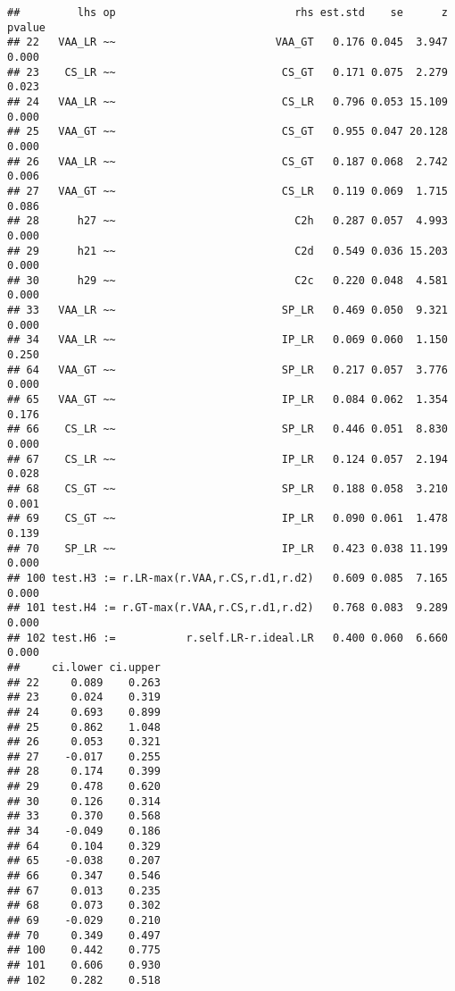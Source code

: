 \documentclass[
]{article}
\newenvironment{Shaded}{\begin{snugshade}}{\end{snugshade}}
\newcommand{\CommentTok}[1]{\textcolor[rgb]{0.56,0.35,0.01}{\textit{#1}}}
\newcommand{\DecValTok}[1]{\textcolor[rgb]{0.00,0.00,0.81}{#1}}
\newcommand{\KeywordTok}[1]{\textcolor[rgb]{0.13,0.29,0.53}{\textbf{#1}}}
\newcommand{\NormalTok}[1]{#1}
\newcommand{\OperatorTok}[1]{\textcolor[rgb]{0.81,0.36,0.00}{\textbf{#1}}}
\newcommand{\StringTok}[1]{\textcolor[rgb]{0.31,0.60,0.02}{#1}}
\begin{document}
\begin{verbatim}
##         lhs op                            rhs est.std    se      z pvalue
## 22   VAA_LR ~~                         VAA_GT   0.176 0.045  3.947  0.000
## 23    CS_LR ~~                          CS_GT   0.171 0.075  2.279  0.023
## 24   VAA_LR ~~                          CS_LR   0.796 0.053 15.109  0.000
## 25   VAA_GT ~~                          CS_GT   0.955 0.047 20.128  0.000
## 26   VAA_LR ~~                          CS_GT   0.187 0.068  2.742  0.006
## 27   VAA_GT ~~                          CS_LR   0.119 0.069  1.715  0.086
## 28      h27 ~~                            C2h   0.287 0.057  4.993  0.000
## 29      h21 ~~                            C2d   0.549 0.036 15.203  0.000
## 30      h29 ~~                            C2c   0.220 0.048  4.581  0.000
## 33   VAA_LR ~~                          SP_LR   0.469 0.050  9.321  0.000
## 34   VAA_LR ~~                          IP_LR   0.069 0.060  1.150  0.250
## 64   VAA_GT ~~                          SP_LR   0.217 0.057  3.776  0.000
## 65   VAA_GT ~~                          IP_LR   0.084 0.062  1.354  0.176
## 66    CS_LR ~~                          SP_LR   0.446 0.051  8.830  0.000
## 67    CS_LR ~~                          IP_LR   0.124 0.057  2.194  0.028
## 68    CS_GT ~~                          SP_LR   0.188 0.058  3.210  0.001
## 69    CS_GT ~~                          IP_LR   0.090 0.061  1.478  0.139
## 70    SP_LR ~~                          IP_LR   0.423 0.038 11.199  0.000
## 100 test.H3 := r.LR-max(r.VAA,r.CS,r.d1,r.d2)   0.609 0.085  7.165  0.000
## 101 test.H4 := r.GT-max(r.VAA,r.CS,r.d1,r.d2)   0.768 0.083  9.289  0.000
## 102 test.H6 :=           r.self.LR-r.ideal.LR   0.400 0.060  6.660  0.000
##     ci.lower ci.upper
## 22     0.089    0.263
## 23     0.024    0.319
## 24     0.693    0.899
## 25     0.862    1.048
## 26     0.053    0.321
## 27    -0.017    0.255
## 28     0.174    0.399
## 29     0.478    0.620
## 30     0.126    0.314
## 33     0.370    0.568
## 34    -0.049    0.186
## 64     0.104    0.329
## 65    -0.038    0.207
## 66     0.347    0.546
## 67     0.013    0.235
## 68     0.073    0.302
## 69    -0.029    0.210
## 70     0.349    0.497
## 100    0.442    0.775
## 101    0.606    0.930
## 102    0.282    0.518
\end{verbatim}

\begin{Shaded}
\end{Shaded}
\end{document}
